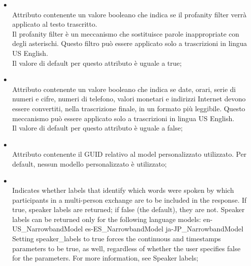 \begin{itemize}
\begin{itemize}
		\item[]  \\
		Attributo contenente un valore booleano che indica se il profanity filter verrà applicato al testo trascritto. \\
Il profanity filter è un meccanismo che sostituisce parole inappropriate con degli asterischi. Questo filtro può essere applicato solo a trascrizioni in lingua US English. \\
Il valore di default per questo attributo è uguale a true;
		\item[]  \\
		Attributo contenente un valore booleano che indica se date, orari, serie di numeri e cifre, numeri di telefono, valori monetari e indirizzi Internet devono essere convertiti, nella trascrizione finale, in un formato più leggibile. Questo meccanismo può essere applicato solo a trascrizioni in lingua US English. \\
Il valore di default per questo attributo è uguale a false;
		\item[]  \\
		Attributo contenente il GUID relativo al model personalizzato utilizzato. Per default, nessun modello personalizzato è utilizzato;
		\item[]  \\
		Indicates whether labels that identify which words were spoken by which participants in a multi-person exchange are to be included in the response. If true, speaker labels are returned; if false (the default), they are not. Speaker labels can be returned only for the following language models:
en-US\_NarrowbandModel
es-ES\_NarrowbandModel
ja-JP\_NarrowbandModel
Setting speaker\_labels to true forces the continuous and timestamps parameters to be true, as well, regardless of whether the user specifies false for the parameters. For more information, see Speaker labels;
	\end{itemize}
\end{itemize}


